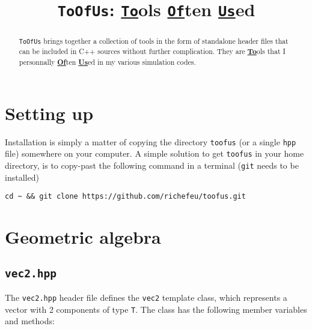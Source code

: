\documentclass[a4paper,onecolumn,11pt]{doofus}
\title{\texttt{ToOfUs}: \underline{\texttt{To}}ols \underline{\texttt{Of}}ten \underline{\texttt{Us}}ed}
\begin{document}
\makedoofustitle

\begin{abstract}
\texttt{ToOfUs} brings together a collection of tools in the form of standalone header files that can be included in C++ sources without further complication.
They are \underline{\textbf{To}}ols that I personnally \underline{\textbf{Of}}ten \underline{\textbf{Us}}ed in my various simulation codes.
\end{abstract}

\setcounter{tocdepth}{2}
\tableofcontents

\section{Setting up}



Installation is simply a matter of copying the directory \texttt{toofus} (or a single \texttt{hpp} file) somewhere on your computer.
A simple solution to get \texttt{toofus} in your home directory, is to copy-past the following command in a terminal (\texttt{git} needs to be installed)
%
\begin{lstlisting}
cd ~ && git clone https://github.com/richefeu/toofus.git
\end{lstlisting}





\section{Geometric algebra}


\subsection{\texttt{vec2.hpp}}

The \texttt{vec2.hpp} header file defines the \texttt{vec2} template class, which represents a vector with 2 components of type \texttt{T}. The class has the following member variables and methods:
\end{document}
